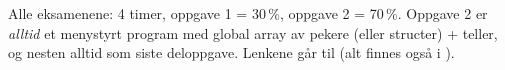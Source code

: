 

Alle eksamenene: 4 timer, oppgave 1 = 30\,\%, oppgave 2 = 70\,\%. Oppgave 2 er \emph{alltid} et menystyrt program med
global array av pekere (eller structer) + teller, og nesten alltid  som siste deloppgave.
Lenkene går til \href{https://frh.folk.ntnu.no/grprog/eksamen/}{} (alt finnes også i ).

